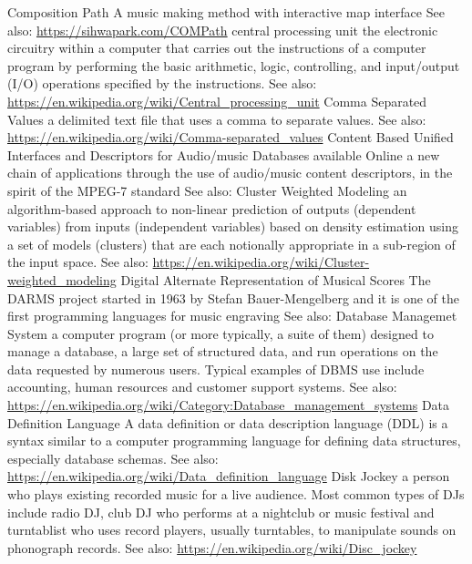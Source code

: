 	{Composition Path}
	{A music making method with interactive map interface See also: \url{https://sihwapark.com/COMPath}}
	{central processing unit}
	{the electronic circuitry within a computer that carries out the instructions of a computer program by performing the basic arithmetic, logic, controlling, and input/output (I/O) operations specified by the instructions.  See also: \url{https://en.wikipedia.org/wiki/Central_processing_unit}}
	{Comma Separated Values}
	{ a delimited text file that uses a comma to separate values. See also: \url{https://en.wikipedia.org/wiki/Comma-separated_values}}
	{Content Based Unified Interfaces and Descriptors for Audio/music Databases available Online}
	{a new chain of applications through the use of audio/music content descriptors, in the spirit of the MPEG-7 standard See also: \url{} \cite{DBLP:conf/ismir/VinetHP02, DBLP:conf/icmc/VinetHP02}}
	{Cluster Weighted Modeling}
	{an algorithm-based approach to non-linear prediction of outputs (dependent variables) from inputs (independent variables) based on density estimation using a set of models (clusters) that are each notionally appropriate in a sub-region of the input space. See also: \url{https://en.wikipedia.org/wiki/Cluster-weighted_modeling}}
	{Digital Alternate Representation of Musical Scores}
	{The DARMS project started in 1963 by Stefan Bauer-Mengelberg and it is one of the first programming languages for music engraving See also: \url{} \cite{icmc/bbp2372.1983.002, 10.2307/30204239}}
	{Database Managemet System}
	{a computer program (or more typically, a suite of them) designed to manage a database, a large set of structured data, and run operations on the data requested by numerous users. Typical examples of DBMS use include accounting, human resources and customer support systems. See also: \url{https://en.wikipedia.org/wiki/Category:Database_management_systems}}
	{Data Definition Language}
	{A data definition or data description language (DDL) is a syntax similar to a computer programming language for defining data structures, especially database schemas. See also: \url{https://en.wikipedia.org/wiki/Data_definition_language}}
	{Disk Jockey}
	{a person who plays existing recorded music for a live audience. Most common types of DJs include radio DJ, club DJ who performs at a nightclub or music festival and turntablist who uses record players, usually turntables, to manipulate sounds on phonograph records.  See also: \url{https://en.wikipedia.org/wiki/Disc_jockey}}

